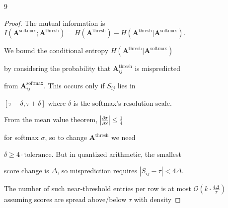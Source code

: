 \documentclass[11pt]{article}
\theoremstyle{definition}
\begin{document}
\begin{thebibliography}{9}
{{{\begin{proof}






The mutual information is $I(\mathbf{A}^{\text{softmax}}; \mathbf{A}^{\text{thresh}}) = 






H(\mathbf{A}^{\text{thresh}}) - H(\mathbf{A}^{\text{thresh}} | \mathbf{A}^{\text{softmax}})$.






We bound the conditional entropy $H(\mathbf{A}^{\text{thresh}} | \mathbf{A}^{\text{softmax}})$






by considering the probability that $\mathbf{A}^{\text{thresh}}_{ij}$ is mispredicted






from $\mathbf{A}^{\text{softmax}}_{ij}$. This occurs only if $S_{ij}$ lies in






$[\tau - \delta, \tau + \delta]$ where $\delta$ is the softmax's resolution scale.






From the mean value theorem, $\left| \frac{\partial \sigma}{\partial S} \right| \leq \frac{1}{4}$






for softmax $\sigma$, so to change $\mathbf{A}^{\text{thresh}}$ we need






$\delta \geq 4 \cdot \text{tolerance}$. But in quantized arithmetic, the smallest






score change is $\Delta$, so misprediction requires $|S_{ij} - \tau| < 4\Delta$.






The number of such near-threshold entries per row is at most $\mathcal{O}(k \cdot






\frac{4\Delta}{\tau})$ assuming scores are spread above/below $\tau$ with density







\end{proof}}}}
\end{thebibliography}
\end{document}
